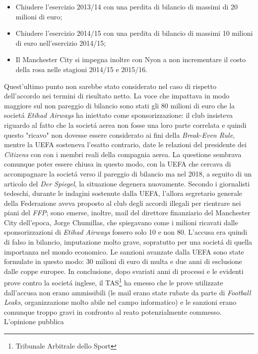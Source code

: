 \documentclass[
    corpo=12pt,
    oneside,
    evenboxes,
    tipotesi=triennale,
    stile=classica,
    oldstyle,
    autoretitolo,
    greek,
]{toptesi}
\begin{document}
\begin{interlinea}{1.5}
\begin{itemize}
    \item Chiudere l’esercizio 2013/14 con una perdita di bilancio di massimi di 20 milioni di euro;
    \item Chiudere l’esercizio 2014/15 con una perdita di bilancio di massimi 10 milioni di euro nell’esercizio 2014/15;
    \item Il Manchester City si impegna inoltre con Nyon a non incrementare il costo della rosa nelle stagioni 2014/15 e 2015/16.
\end{itemize}
Quest'ultimo punto non sarebbe stato considerato nel caso di rispetto dell'accordo nei termini di risultato netto. \newline
La voce che impattava in modo maggiore sul non pareggio di bilancio sono stati gli 80 milioni di euro che la societ\'a \emph{Etihad Airways}
ha iniettato come sponsorizzazione: il club insisteva riguardo al fatto che la societ\'a aerea non fosse una loro parte correlata e quindi questo
"ricavo" non dovesse essere considerato ai fini della \emph{Break-Even Rule}, mentre la UEFA sosteneva l'esatto contrario, date le 
relazioni del presidente dei \emph{Citizens} con con i membri reali della compagnia aerea. 
La questione sembrava comunque poter essere chiusa in questo modo, con la UEFA che cercava di accompagnare la societ\'a verso il 
pareggio di bilancio ma nel 2018, a seguito di un articolo del \emph{Der Spiegel}, la situazione degenera nuovamente.
Secondo i giornalisti tedeschi, durante le indagini sostenute dalla UEFA, l'allora segretario generale della Federazione aveva proposto al club degli accordi illegali per
rientrare nei piani del \emph{FFP}; sono emerse, inoltre, mail del direttore finanziario del Manchester
City dell'epoca, Jorge Chumillas, che spiegavano come i milioni ricavati dalle \linebreak sponsorizzazioni di \emph{Etihad Airways} fossero solo 10 e non 80.
L'accusa era quindi di falso in bilancio, imputazione molto grave, sopratutto per una societ\'a di quella importanza nel mondo economico. Le 
sanzioni avanzate dalla UEFA sono state formulate in questo modo: 30 milioni di euro di multa e due anni di esclusione dalle coppe europee.
In conclusione, dopo svariati anni di processi e le evidenti prove contro la societ\'a inglese, il TAS\footnote{Tribunale Arbitrale dello Sport} ha 
emesso che le prove utilizzate dall'accusa non erano ammissibili (le mail erano state rubate da parte di \emph{Football Leaks}, organizzazione molto
abile nel campo informatico) e le sanzioni erano comunque troppo gravi in confronto al reato potenzialmente commesso. L'opinione pubblica

\end{interlinea}
\end{document}

